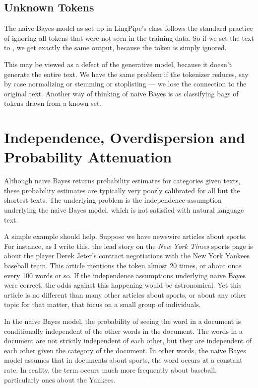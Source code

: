 \subsection{Unknown Tokens}

The naive Bayes model as set up in LingPipe's
 class follows the standard practice
of ignoring all tokens that were not seen in the training data.  So
if we set the text to , we get exactly
the same output, because the token  is simply
ignored.

This may be viewed as a defect of the generative model, because it
doesn't generate the entire text.  We have the same problem if the
tokenizer reduces, say by case normalizing or stemming or stoplisting
--- we lose the connection to the original text.  Another way of
thinking of naive Bayes is as classifying bags of tokens drawn
from a known set. 


\section{Independence, Overdispersion and Probability Attenuation}

Although naive Bayes returns probability estimates for categories
given texts, these probability estimates are typically very poorly
calibrated for all but the shortest texts.  The underlying problem is
the independence assumption underlying the naive Bayes model, which
is not satisfied with natural language text.  

A simple example should help.  Suppose we have newswire articles about
sports.  For instance, as I write this, the lead story on the {\it New
  York Times} sports page is about the player Derek Jeter's contract
negotiations with the New York Yankees baseball team.  This article
mentions the token  almost 20 times, or about
once every 100 words or so.  If the independence assumptions
underlying naive Bayes were correct, the odds against this happening
would be astronomical.  Yet this article is no different than many
other articles about sports, or about any other topic for that matter,
that focus on a small group of individuals.

In the naive Bayes model, the probability of seeing the word
 in a document is conditionally independent of
the other words in the document.  The words in a document are
not strictly independent of each other, but they are independent
of each other given the category of the document.  In other words,
the naive Bayes model assumes that in documents about sports,
the word  occurs at a constant rate.  In
reality, the term  occurs much more frequently
about baseball, particularly ones about the Yankees.

